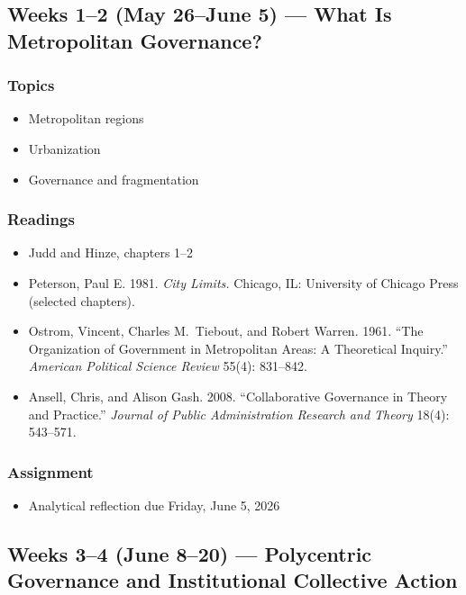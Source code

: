 \documentclass[12pt]{article}
\begin{document}
\bigskip

\subsection*{Weeks 1--2 (May 26--June 5) --- What Is Metropolitan Governance?}
    \subsubsection*{Topics}
        \begin{itemize}
            \item Metropolitan regions
            \item Urbanization
            \item Governance and fragmentation
        \end{itemize}
    \subsubsection*{Readings}
        \begin{itemize}
            \item Judd and Hinze, chapters 1--2
            \item Peterson, Paul E. 1981. \emph{City Limits.} Chicago, IL: University of Chicago Press (selected chapters).
            \item Ostrom, Vincent, Charles M.\ Tiebout, and Robert Warren. 1961. ``The Organization of Government in Metropolitan Areas: A Theoretical Inquiry.'' \emph{American Political Science Review} 55(4): 831--842.
            \item Ansell, Chris, and Alison Gash. 2008. ``Collaborative Governance in Theory and Practice.'' \emph{Journal of Public Administration Research and Theory} 18(4): 543--571.
        \end{itemize}
    \subsubsection*{Assignment}
        \begin{itemize}
            \item Analytical reflection due Friday, June 5, 2026
        \end{itemize}

\subsection*{Weeks 3--4 (June 8--20) --- Polycentric Governance and Institutional Collective Action}
\end{document}
